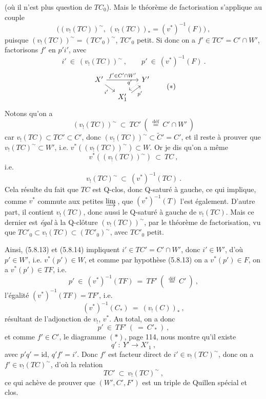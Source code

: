 \documentclass[11pt]{article}
\newcommand{\printedpage}[1]{\marginpar{\footnotesize p.~#1}}
\newcommand{\msp}[1]{\marginpar{\footnotesize [#1]}}
\newcommand{\defeq}{\overset{\text{déf}}{=}}
\newcommand{\cl}{^{\sim}}%
\begin{document}
(où il n'est plus question de $TC_0$). Mais le théorème de factorisation s'applique au couple
\[
\Big( (v_!(TC))\cl,\ (v_!(TC))_* = (v^*)^{-1}(F) \Big)\ ,
\]
puisque $(v_!(TC))\cl = (TC'_0)\cl$, $TC'_0$ petit. Si donc on a $f' \in TC' = C' \cap W'$, factorisons $f'$ en $p'i'$, avec
\[
i' \ \in \ (v_!(TC))\cl\ , \qquad p' \ \in \ (v^*)^{-1}(F)\ .
\tag*{(5.8.13)}
\]
\[
\begin{tikzcd}[column sep=small, row sep=small]
X' \arrow[rr, "f' \in C' \cap W'"] \arrow[dr, "i'"'] & & Y' \arrow[dl, dotted, shift right, "q'"'] \\
& X'_1 \arrow[ur, shift right, "p'"'] &
\end{tikzcd}
\tag*{$(*)$}
\]
Notons qu'on a
\msp{page 95}
\[
(v_!(TC))\cl \ \subset \ TC' \ (\ \defeq \ C' \cap W'\ )
\tag*{(5.8.14)}
\]
car $v_!(TC) \subset TC' \subset C'$, donc $(v_!(TC))\cl \subset \tilde{C}' = C'$, et il reste à prouver que $v_!(TC)\cl \subset W'$, i.e. $v^*((v_!(TC))\cl) \subset W$. Or je dis qu'on a même
\[
v^*((v_!(TC))\cl) \ \subset \ TC\ ,
\]
i.e.
\[
v_!(TC)\cl \ \subset \ (v^*)^{-1}(TC)\ .
\tag*{(5.8.15)}
\]
Cela résulte du fait que $TC$ est Q-clos, donc Q-saturé à gauche, ce qui implique, comme $v^*$ commute aux petites $\varinjlim$\,, que $(v^*)^{-1}(T)$ l'est également. D'autre part, il contient $v_!(TC)$, donc aussi le Q-saturé à gauche de $v_!(TC)$. Mais ce dernier est \textit{égal} à la Q-clôture $(v_!(TC))\cl$, par le théorème de factorisation, vu que $TC'_0 \subset v_!(TC) \subset (TC'_0)\cl$, avec $TC'_0$ petit. %

Ainsi, (5.8.13) et (5.8.14) impliquent $i' \in TC' = C' \cap W'$, donc $i' \in W'$, d'où $p' \in W'$, i.e. $v^*(p') \in W$, et comme par hypothèse
\printedpage{48}
\msp{page 96}
(5.8.13) on a $v^*(p') \in F$, on a $v^*(p') \in TF$, i.e.
\[
p' \ \in \ (v^*)^{-1}(TF) \ = \ TF' \ (\ \defeq \ C'\ )\ , %
\]
l'égalité $(v^*)^{-1}(TF) = TF'$, i.e.
\[
(v^*)^{-1}(C_*) \ = \ (v_!(C))_*\ ,
\]
résultant de l'adjonction de $v_!$, $v^*$. Au total, on a donc
\[
p' \ \in \ TF' \ (\ = \ C'_*\ )\ ,
\tag*{(5.8.16)}
\]
et comme $f' \in C'$, le diagramme $(*)$, page 114, nous montre qu'il existe
\[
q' \ : \ Y' \longrightarrow X'_1\ ,
\]
avec $p'q' = \mathrm{id}$, $q'f' = i'$. Donc $f'$ est facteur direct de $i' \in v_!(TC)\cl$, donc on a $f' \in v_!(TC)\cl$, d'où la relation
\[
TC' \ \subset \ v_!(TC)\cl\ ,
\]
ce qui achève de prouver que $(W', C', F')$ est un triple de Quillen spécial et clos.
\end{document}
